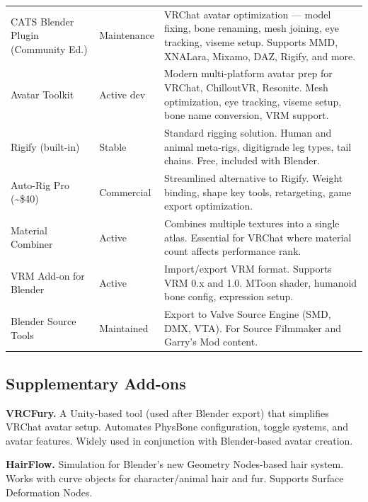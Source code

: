\begin{center}
\begin{tabularx}{\textwidth}{L{3.5cm}C{2cm}X}
\toprule
{}
 &  &  \\
\midrule
CATS Blender Plugin (Community Ed.) & Maintenance & VRChat avatar optimization --- model fixing, bone renaming, mesh joining, eye tracking, viseme setup. Supports MMD, XNALara, Mixamo, DAZ, Rigify, and more. \\
Avatar Toolkit & Active dev & Modern multi-platform avatar prep for VRChat, ChilloutVR, Resonite. Mesh optimization, eye tracking, viseme setup, bone name conversion, VRM support. \\
Rigify (built-in) & Stable & Standard rigging solution. Human and animal meta-rigs, digitigrade leg types, tail chains. Free, included with Blender. \\
Auto-Rig Pro (\~{}\$40) & Commercial & Streamlined alternative to Rigify. Weight binding, shape key tools, retargeting, game export optimization. \\
Material Combiner & Active & Combines multiple textures into a single atlas. Essential for VRChat where material count affects performance rank. \\
VRM Add-on for Blender & Active & Import/export VRM format. Supports VRM 0.x and 1.0. MToon shader, humanoid bone config, expression setup. \\
Blender Source Tools & Maintained & Export to Valve Source Engine (SMD, DMX, VTA). For Source Filmmaker and Garry's Mod content. \\
\bottomrule
\end{tabularx}
\end{center}


\subsection{Supplementary Add-ons}

\textbf{VRCFury.} A Unity-based tool (used after Blender export) that simplifies VRChat avatar setup. Automates PhysBone configuration, toggle systems, and avatar features. Widely used in conjunction with Blender-based avatar creation.

\textbf{HairFlow.} Simulation for Blender's new Geometry Nodes-based hair system. Works with curve objects for character/animal hair and fur. Supports Surface Deformation Nodes.

